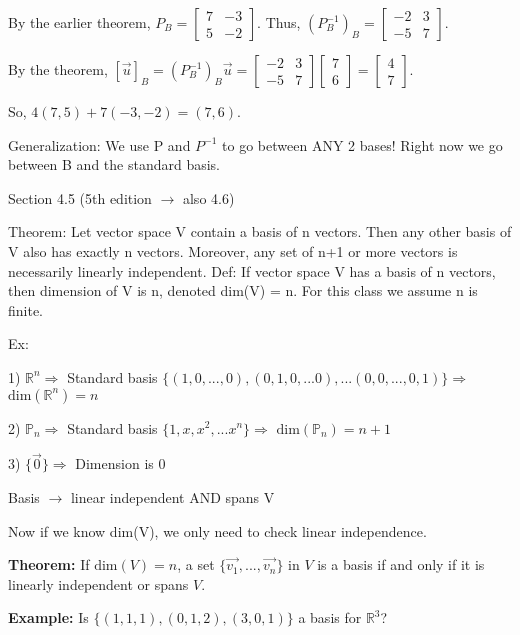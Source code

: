 \documentclass{article}
\begin{document}
By the earlier theorem, \(P_B = \begin{bmatrix} 7 & -3 \\ 5 & -2 \end{bmatrix}\). Thus, \((P_B^{-1})_B = \begin{bmatrix} -2 & 3 \\ -5 & 7 \end{bmatrix}\). 

By the theorem, \([\vec{u}]_B = (P_B^{-1})_B \vec{u} = \begin{bmatrix} -2 & 3 \\ -5 & 7 \end{bmatrix} \begin{bmatrix} 7 \\ 6 \end{bmatrix} = \begin{bmatrix} 4 \\ 7 \end{bmatrix}\). 

So, \(4(7,5) + 7(-3,-2) = (7,6)\).

Generalization: We use P and $P^{-1}$ to go between ANY 2 bases! Right now we go between B and the standard basis.

Section 4.5 (5th edition $\rightarrow$ also 4.6)

Theorem: Let vector space V contain a basis of n vectors. Then any other basis of V also has exactly n vectors. Moreover, any set of n+1 or more vectors is necessarily linearly independent. Def: If vector space V has a basis of n vectors, then dimension of V is n, denoted dim(V) = n. For this class we assume n is finite.

Ex: 

1) $\mathbb{R}^n \Rightarrow$ Standard basis $\{(1,0,...,0), (0,1,0,...0), ... (0,0,...,0,1)\} \Rightarrow$ $\text{dim}(\mathbb{R}^n) = n$

2) $\mathbb{P}_n \Rightarrow$ Standard basis $\{1, x, x^2, ... x^n\} \Rightarrow$ $\text{dim}(\mathbb{P}_n) = n+1$

3) $\{\vec{0}\} \Rightarrow$ Dimension is 0

Basis $\rightarrow$ linear independent AND spans V

Now if we know dim(V), we only need to check linear independence.

\textbf{Theorem:} If $\text{dim}(V) = n$, a set $\{\vec{v_1}, ..., \vec{v_n}\}$ in $V$ is a basis if and only if it is linearly independent or spans $V$.

\textbf{Example:} Is $\{(1,1,1),(0,1,2),(3,0,1)\}$ a basis for $\mathbb{R}^3$?
\end{document}
